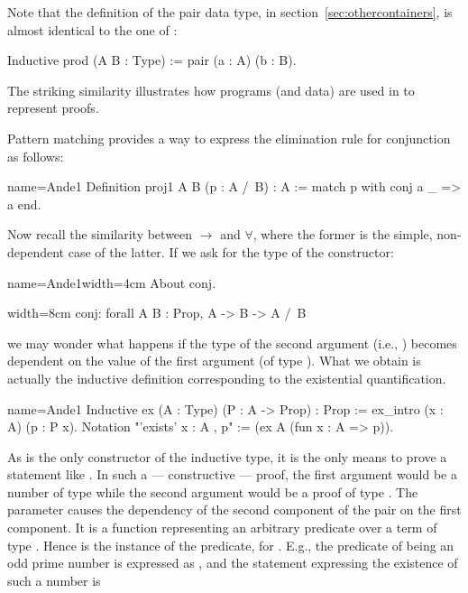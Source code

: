 Note that the definition of the pair data type,
in section~\ref{sec:othercontainers}, is almost identical to the one
of :

\begin{coq}{}{}
Inductive prod (A B : Type) := pair (a : A) (b : B).
\end{coq}
The striking similarity illustrates how programs (and data) are used in \Coq{}
to represent proofs.

Pattern matching provides a way to express the elimination rule for
conjunction as follows:

\begin{coq}{name=Ande1}{}
Definition proj1 A B (p : A /\ B) : A :=
  match p with conj a _ => a end.
\end{coq}

Now recall the similarity between $\to$ and $\forall$, where the former is the
simple, non-dependent case of the latter.  If we ask for the type of
the  constructor:

\begin{coq}{name=Ande1}{width=4cm}
About conj.
\end{coq}
\begin{coqout}{}{width=8cm}
conj: forall A B : Prop, A -> B -> A /\ B
\end{coqout}
we may wonder what happens if the type of the second argument (i.e., )
becomes dependent on the value of the first argument (of type ).
What we obtain is actually the inductive definition corresponding to the
existential quantification.

\begin{coq}{name=Ande1}{}
Inductive ex (A : Type) (P : A -> Prop) : Prop :=
  ex_intro (x : A) (p : P x).
Notation "'exists' x : A , p" := (ex A (fun x : A => p)).
\end{coq}

As   is the only constructor of the  inductive
type, it is the only means to prove a statement like
.  In such a --- constructive --- proof, the first
argument would be a number
 of type  while the second argument would be a proof  of type
.  The parameter  causes the dependency of the
second component of the pair on the first component. It is a function
representing an arbitrary predicate over a term of
type .  Hence  is the instance of the predicate, for .  E.g.,
the predicate of being an odd prime number is expressed as
, and the statement expressing the
existence of such a number is

